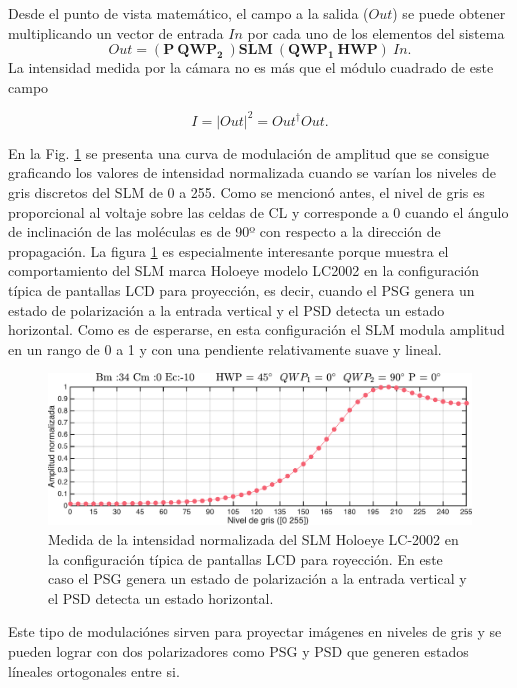 Desde el punto de vista matemático, el campo a la salida ($Out$) se puede
obtener multiplicando un vector de entrada $In$ por cada uno de
los elementos del sistema 
\begin{equation}
\label{eq:ChGV_Out}
Out = \left( \mathbf{P}\ \mathbf{QWP_2}\ \right) \mathbf{SLM}\ \left( \mathbf{QWP_1}\
\mathbf{HWP}\right)\ In.
\end{equation}
La intensidad medida por la cámara no es más que el módulo cuadrado de
este campo

\begin{equation}
I = |Out|^2 = Out^{\dagger}Out.
\end{equation}

En la Fig. \ref{fig:amp_H_V_SLM_2002} se presenta
una curva de modulación de amplitud que se consigue graficando los
valores de intensidad normalizada cuando se varían los niveles de gris discretos
del SLM de 0 a 255. Como se mencionó antes, el nivel de gris es
proporcional al voltaje sobre las celdas de CL y corresponde a 0
cuando el ángulo de inclinación de las moléculas es de 90º con
respecto a la dirección de propagación. La
figura \ref{fig:amp_H_V_SLM_2002} es especialmente interesante porque
muestra el comportamiento del SLM marca Holoeye modelo LC2002 en la
configuración típica de pantallas LCD para proyección, es decir, cuando
el PSG genera un estado de polarización a la entrada vertical y el
PSD detecta un estado horizontal. Como es de esperarse, en esta
configuración el SLM modula amplitud en un rango de 0 a 1 y con una
pendiente relativamente suave y lineal. 
\begin{figure}[h!]
\centering
\includegraphics[scale=.55]{amp_H_V_SLM_2002.pdf}
\caption[Curva de modulación de amplitud para un estado no
óptimo]{Medida de la intensidad normalizada del SLM Holoeye LC-2002 en la configuración típica
  de pantallas LCD para royección. En este caso el PSG genera un estado de
  polarización a la entrada vertical y el PSD detecta un estado horizontal.}
\label{fig:amp_H_V_SLM_2002}
\end{figure}
Este tipo de modulaciónes
sirven para proyectar imágenes en niveles de gris y se pueden lograr
con dos polarizadores como PSG y PSD que generen estados líneales ortogonales
entre si.

